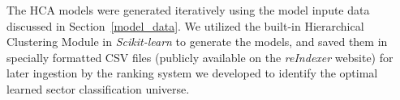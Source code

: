 \documentclass[../main.tex]{subfiles}
\begin{document}
The HCA models were generated iteratively using the model inpute data discussed in Section~\ref{model_data}. We utilized the built-in Hierarchical Clustering Module in \textit{Scikit-learn} to generate the models, and saved them in specially formatted CSV files (publicly available on the \textit{reIndexer} website) for later ingestion by the ranking system we developed to identify the optimal learned sector classification universe.






\end{document}
